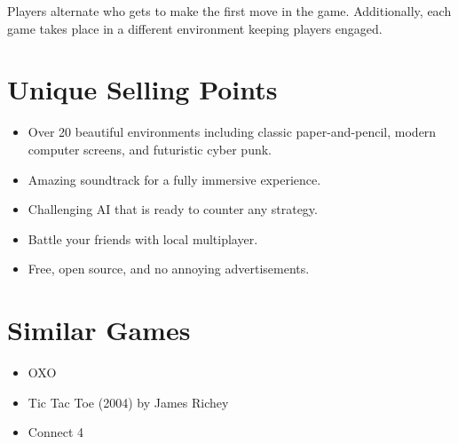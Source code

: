 \documentclass{tufte-handout}
\begin{document}
Players alternate who gets to make the first move in the game. Additionally,
each game takes place in a different environment keeping players engaged.


\section{Unique Selling Points}
\begin{itemize}[noitemsep]
  \item {
    Over 20 beautiful environments including classic paper-and-pencil, modern
    computer screens, and futuristic cyber punk.
  }
  \item Amazing soundtrack for a fully immersive experience.
  \item Challenging AI that is ready to counter any strategy.
  \item Battle your friends with local multiplayer.
  \item Free, open source, and no annoying advertisements.
\end{itemize}


\section{Similar Games}
\begin{itemize}[noitemsep]
  \item OXO
  \item Tic Tac Toe (2004) by James Richey
  \item Connect 4
\end{itemize}
\end{document}
